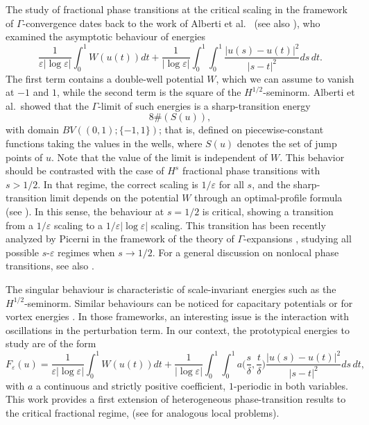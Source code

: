 \documentclass[12pt]{article}
\numberwithin{equation}{section}
\begin{document}
\smallskip
The study of fractional phase transitions at the critical scaling in the framework of $\Gamma$-convergence dates back to the work of Alberti et al.~\cite{ABS} (see also \cite{AB}), who examined the asymptotic behaviour of energies
\begin{equation}
    \frac{1}{\varepsilon|\log{\varepsilon}|}\int_{0}^{1}W(u(t))dt+\frac{1}{|\log\varepsilon|}\int_{0}^{1}\int_{0}^{1}\frac{\left|u(s)-u(t)\right|^2}{\left|s-t\right|^2}ds\,dt.
\end{equation}
The first term contains a double-well potential $W$, which we can assume to vanish at $-1$ and $1$, while the second term is the square of the $H^{1/2}$-seminorm. Alberti et al.~showed that the $\Gamma$-limit of such energies is
a sharp-transition energy \begin{equation}\label{shat} 
8 \#(S(u)),
\end{equation} 
with domain $BV((0,1);\{-1,1\})$; that is, defined on piecewise-constant functions taking the values in the wells, where $S(u)$ denotes the set of jump points of $u$. Note that the value of the limit is independent of $W$. This behavior should be contrasted with the case of $H^s$ fractional phase transitions with $s>1/2$. In that regime, the correct scaling is $1/\varepsilon$ for all $s$,
and the sharp-transition limit depends on the potential $W$ through an optimal-profile formula (see \cite{SV,Solci2,PaVi}). In this sense, the behaviour at $s=1/2$ is critical, showing a transition from a $1/\varepsilon$ scaling to a $1/\varepsilon|\log\varepsilon|$
scaling. This transition has been recently analyzed by Picerni \cite{Pic} in the framework of the theory of $\Gamma$-expansions \cite{BT}, studying all possible $s$-$\varepsilon$ regimes when $s\to1/2$. For a general discussion on nonlocal phase transitions, see also \cite{DipVal}.

The singular behaviour is characteristic of scale-invariant energies such as the $H^{1/2}$-seminorm. Similar behaviours can be noticed for capacitary potentials or for vortex energies \cite{BBH,ABO}.
In those frameworks, an interesting issue is the interaction with oscillations in the perturbation term. In our context, the prototypical energies to study are of the form 
\begin{equation}
F_\varepsilon(u)=    \frac{1}{\varepsilon|\log{\varepsilon}|}\int_{0}^{1}W(u(t))dt+\frac{1}{|\log\varepsilon|}\int_{0}^{1}\int_{0}^{1}a\Big(\frac{s}\delta,\frac{t}\delta
    \Big)\frac{\left|u(s)-u(t)\right|^2}{\left|s-t\right|^2}ds\,dt,
\end{equation}
with $a$ a continuous and strictly positive coefficient, $1$-periodic in both variables. This work provides a first extension of heterogeneous phase-transition results to the critical fractional regime, (see \cite{Ansini_Braides_Chiado_2003,MR4633768,MR4898688,MR4014392} for analogous local problems).
\end{document}
